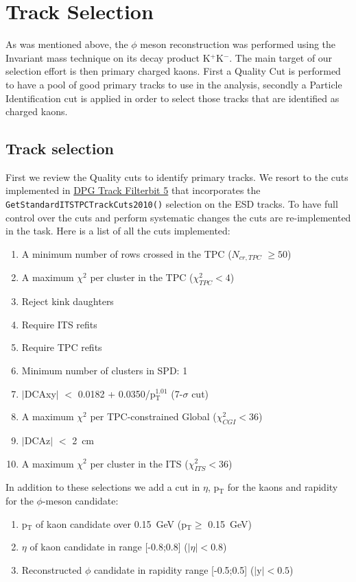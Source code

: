 \section{Track Selection}
\label{sec:Trackselection}

As was mentioned above, the $\phi$ meson reconstruction was performed using the Invariant mass technique on its decay product K$^{+}$K$^{-}$. The main target of our selection effort is then primary charged kaons. First a Quality Cut is performed to have a pool of good primary tracks to use in the analysis, secondly a Particle Identification cut is applied in order to select those tracks that are identified as charged kaons.
\subsection{Track selection}
First we review the Quality cuts to identify primary tracks. We resort to the cuts implemented in \href{https://twiki.cern.ch/twiki/bin/viewauth/ALICE/AliDPGtoolsFilteringCuts#Run_flag_1000_AddTrackCutsLHC10b}{DPG Track Filterbit 5} that incorporates the \texttt{GetStandardITSTPCTrackCuts2010()} selection on the ESD tracks. To have full control over the cuts and perform systematic changes the cuts are re-implemented in the task. Here is a list of all the cuts implemented:
\begin{enumerate}
\item A minimum number of rows crossed in the TPC ($N_{cr,TPC}$ $\geq 50$)
\item A maximum $\chi^2$ per cluster in the TPC ($\chi^2_{TPC} < 4$)
\item Reject kink daughters
\item Require ITS refits
\item Require TPC refits
\item Minimum number of clusters in SPD: 1
\item $|$DCAxy$|$ $<$ 0.0182 + 0.0350/p$_{\text{T}}^{1.01}$ (7-$\sigma$ cut)
\item A maximum $\chi^2$ per TPC-constrained Global ($\chi^2_{CGI} < 36$)
\item $|$DCAz$|$ $<$ \SI{2}{\centi \meter}
\item A maximum $\chi^2$ per cluster in the ITS ($\chi^2_{ITS} < 36$)
\end{enumerate}
In addition to these selections we add a cut in $\eta$, p$_{\text{T}}$ for the kaons and rapidity for the $\phi$-meson candidate:
\begin{enumerate}
\item p$_{\text{T}}$ of kaon candidate over \SI{0.15}{\giga\electronvolt} (p$_{\text{T}} \geq$ \SI{0.15}{\giga\electronvolt})
\item $\eta$ of kaon candidate in range [-0.8;0.8] ($|\eta| < 0.8$)
\item Reconstructed $\phi$ candidate in rapidity range [-0.5;0.5] ($|\text{y}| < 0.5$)
\end{enumerate}
